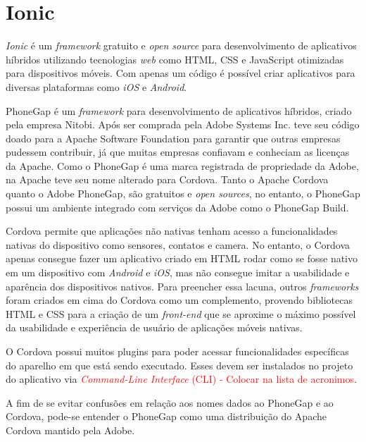 \section{Ionic}

\textit{Ionic} é um \textit{framework} gratuito e \textit{open source} para desenvolvimento de aplicativos híbridos 
utilizando tecnologias 
\textit{web} como HTML, CSS e JavaScript otimizadas para dispositivos móveis. 
Com apenas um código é possível criar aplicativos para diversas plataformas como
\textit{iOS} e \textit{Android}. %

PhoneGap é um \textit{framework} para desenvolvimento de aplicativos híbridos, criado pela empresa Nitobi. 
Após ser comprada pela Adobe Systems Inc. teve seu código doado para a Apache Software Foundation 
para garantir que outras empresas pudessem contribuir, já que muitas empresas confiavam e conheciam as licenças da Apache.
Como o PhoneGap é uma marca registrada de propriedade da Adobe, na Apache teve seu nome alterado para Cordova.
Tanto o Apache Cordova quanto o Adobe PhoneGap, são gratuitos e \textit{open sources}, no entanto, o 
PhoneGap possui um ambiente integrado com serviços da Adobe como o PhoneGap Build.

Cordova permite que aplicações não nativas tenham acesso a funcionalidades nativas do dispositivo como sensores, 
contatos e camera. No entanto, o Cordova apenas consegue fazer um aplicativo criado em 
HTML rodar como se fosse nativo em um dispositivo com \textit{Android} e \textit{iOS}, mas não consegue 
imitar a usabilidade e aparência dos dispositivos nativos. 
Para preencher essa lacuna, outros \textit{frameworks} foram criados em cima do Cordova como um complemento, 
provendo bibliotecas HTML e CSS para a 
criação de um \textit{front-end} que se aproxime o máximo possível da usabilidade e experiência de usuário de 
aplicações móveis nativas.

O Cordova possui muitos plugins para poder acessar funcionalidades específicas do aparelho em que está sendo 
executado. Esses devem ser instalados no projeto do aplicativo via \textcolor{red}{\textit{Command-Line Interface} (CLI) - Colocar na lista de acronimos}. 

A fim de se evitar confusões em relação aos nomes dados ao PhoneGap e ao Cordova, pode-se entender o PhoneGap 
como uma distribuição do Apache Cordova mantido pela Adobe. 

